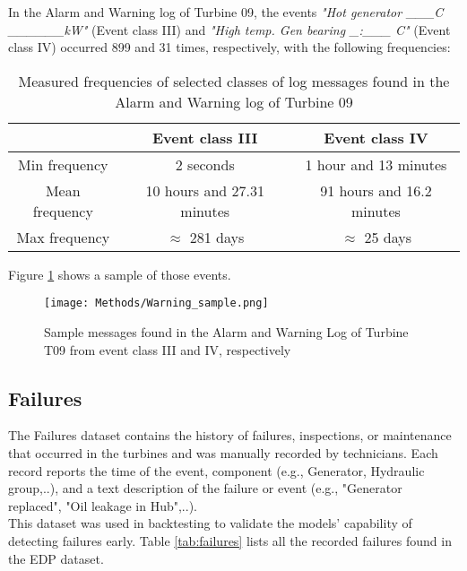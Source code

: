   In the Alarm and Warning log of Turbine 09, the events \emph{"Hot generator \_\_\_\degree C \_\_\_\_\_\_kW"} (Event class III) and 
  \emph{"High temp. Gen bearing \_:\_\_\_ \degree C"} (Event class IV) occurred 899 and 31 times, respectively, with the following frequencies:
  \begin{table}[H]
    \centering
    \begin{tabular}{cc|c|}
      \cline{2-3}
      \multicolumn{1}{c|}{} & \textbf{Event class III} & \textbf{Event class IV} \\
      \hline
      \multicolumn{1}{|c|}{Min frequency} & 2 seconds & 1 hour and 13 minutes \\
      \hline
      \multicolumn{1}{|c|}{Mean frequency} & 10 hours and 27.31 minutes & 91 hours and 16.2 minutes \\
      \hline
      \multicolumn{1}{|c|}{Max frequency} & $\approx$ 281 days & $\approx$ 25 days \\
      \hline
    \end{tabular}
    \caption{Measured frequencies of selected classes of log messages found in the Alarm and Warning log of Turbine 09}
    \label{tab:AlrmWarnLogsT09}
  \end{table}

  \begin{flushleft}
  Figure \ref{fig:sample_warnings} shows a sample of those events.
  \end{flushleft}

  \begin{figure}[H]
    \begin{center}
      \texttt{[image: Methods/Warning\_sample.png]}
    \end{center}
    \caption{Sample messages found in the Alarm and Warning Log of Turbine T09 from event class III and IV, respectively}
    \label{fig:sample_warnings}
  \end{figure}



\subsection{Failures}
  The Failures dataset contains the history of failures, inspections, or maintenance that occurred in the turbines and was manually recorded by technicians. 
  Each record reports the time of the event, component (e.g., Generator, Hydraulic group,..), and a text description of the failure 
  or event (e.g., "Generator replaced", "Oil leakage in Hub",..).\\ 
  This dataset was used in backtesting to validate the models' capability of detecting failures early. Table \ref{tab:failures} lists all the recorded failures found 
  in the EDP dataset.

